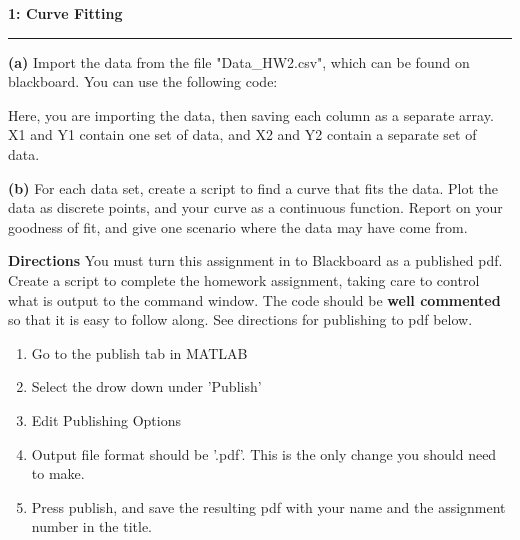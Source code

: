 \documentclass[11pt]{article}
\newcommand\question[2]{\vspace{.25in}\textbf{#1: #2}\vspace{.5em}\hrule\vspace{.10in}}
\renewcommand\part[1]{\vspace{.10in}\textbf{(#1)}}
\begin{document}
\raggedright
\newcommand\NAME{Carl Kingsford}  %
\newcommand\ANDREWID{ckingsf}     %
\newcommand\HWNUM{1}              %


\question{1}{Curve Fitting} 
\part{a} Import the data from the file "Data\_HW2.csv", which can be found on blackboard. You can use the following code:

Here, you are importing the data, then saving each column as a separate array. X1 and Y1 contain one set of data, and X2 and Y2 contain a separate set of data.

\part{b} For each data set, create a script to find a curve that fits the data. Plot the data as discrete points, and your curve as a continuous function. Report on your goodness of fit, and give one scenario where the data may have come from.

\vspace{2.0em}
\textbf{Directions}
You must turn this assignment in to Blackboard as a published pdf. Create a script to complete the homework assignment, taking care to control what is output to the command window. The code should be \textbf{well commented} so that it is easy to follow along. See directions for publishing to pdf below. 

\begin{enumerate} \itemsep -2pt
\item Go to the publish tab in MATLAB
\item Select the drow down under 'Publish'
\item Edit Publishing Options
\item Output file format should be '.pdf'. This is the only change you should need to make.
\item Press publish, and save the resulting pdf with your name and the assignment number in the title.
\end{enumerate}
\end{document}
